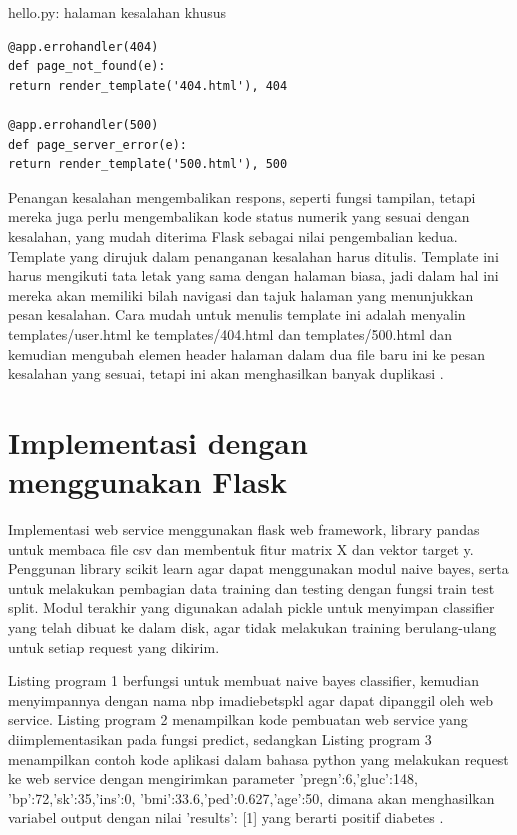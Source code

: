 hello.py: halaman kesalahan khusus
\begin{verbatim}
@app.errohandler(404)
def page_not_found(e):
return render_template('404.html'), 404

@app.errohandler(500)
def page_server_error(e):
return render_template('500.html'), 500
\end{verbatim}

Penangan kesalahan mengembalikan respons, seperti fungsi tampilan, tetapi mereka juga perlu mengembalikan kode status numerik yang sesuai dengan kesalahan, yang mudah diterima Flask sebagai nilai pengembalian kedua.
Template yang dirujuk dalam penanganan kesalahan harus ditulis. Template ini harus mengikuti tata letak yang sama dengan halaman biasa, jadi dalam hal ini mereka akan memiliki bilah navigasi dan tajuk halaman yang menunjukkan pesan kesalahan. Cara mudah untuk menulis template ini adalah menyalin templates/user.html ke templates/404.html dan templates/500.html dan kemudian mengubah elemen header halaman dalam dua file baru ini ke pesan kesalahan yang sesuai, tetapi ini akan menghasilkan banyak duplikasi \cite{grinberg2018flask}.




\section{Implementasi dengan menggunakan Flask}
Implementasi web service menggunakan flask web framework, library pandas untuk membaca file csv dan membentuk fitur matrix X dan vektor target y. Penggunan library scikit learn agar dapat menggunakan modul naive bayes, serta untuk melakukan pembagian data training dan testing dengan fungsi train test split. Modul terakhir yang digunakan adalah pickle untuk menyimpan classifier yang telah dibuat ke dalam disk, agar tidak melakukan training berulang-ulang untuk setiap request yang dikirim.

Listing program 1 berfungsi untuk membuat naive bayes classifier, kemudian menyimpannya dengan nama nbp imadiebetspkl agar dapat dipanggil oleh web service. Listing program 2 menampilkan kode pembuatan web service yang diimplementasikan pada fungsi predict, sedangkan Listing program 3 menampilkan contoh kode aplikasi dalam bahasa python yang melakukan request ke web service dengan mengirimkan parameter 'pregn':6,'gluc':148,
'bp':72,'sk':35,'ins':0,
'bmi':33.6,'ped':0.627,'age':50, dimana akan menghasilkan variabel output dengan nilai {'results': [1]} yang berarti positif diabetes \cite{setyawan2017implementasi}.

